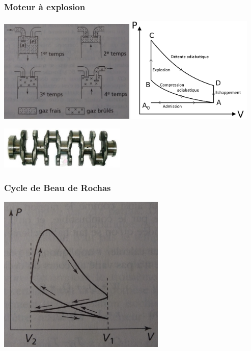 \documentclass{beamer}
\begin{document}
\begin{frame}
\frametitle{Moteur à explosion}
\centerline {\includegraphics[width=6.5cm]{moteur_4_temps}
			\includegraphics[width=6cm]{cycle_explosion} }
\centerline {\includegraphics[width=6cm]{vilebrequin}}
\end{frame}

\begin{frame}
\frametitle{Cycle de Beau de Rochas}
\centerline{\includegraphics[width=8cm]{cycle_beau_de_rochas}}
\end{frame}
\end{document}
